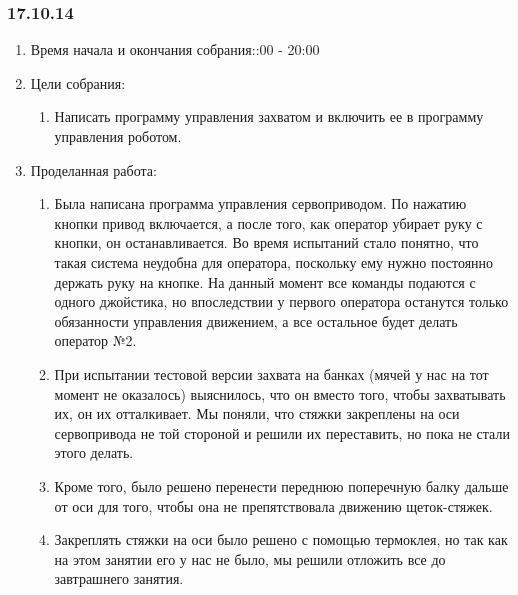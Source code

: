 
\subsubsection{17.10.14}

\begin{enumerate}
	\item Время начала и окончания собрания::00 - 20:00
	\item Цели собрания:\newline
	\begin{enumerate}
	  \item Написать программу управления захватом и включить ее в программу управления роботом.\newline
	  
    \end{enumerate}
    
	\item Проделанная работа:\newline
	\begin{enumerate}
	  \item Была написана программа управления сервоприводом. По нажатию кнопки привод включается, а после того, как оператор убирает руку с кнопки, он останавливается. Во время испытаний стало понятно, что такая система неудобна для оператора, поскольку ему нужно постоянно держать руку на кнопке. На данный момент все команды подаются с одного джойстика, но впоследствии у первого оператора останутся только обязанности управления движением, а все остальное будет делать оператор №2.\newline
      
      \item При испытании тестовой версии захвата на банках (мячей у нас на тот момент не оказалось) выяснилось, что он вместо того, чтобы захватывать их, он их отталкивает. Мы поняли, что стяжки закреплены на оси сервопривода не той стороной и решили их переставить, но пока не стали этого делать.\newline
      
      \item Кроме того, было решено перенести переднюю поперечную балку дальше от оси для того, чтобы она не препятствовала движению щеток-стяжек.\newline
      
      \item Закреплять стяжки на оси было решено с помощью термоклея, но так как на этом занятии его у нас не было, мы решили отложить все до завтрашнего занятия.\newline
      

\end{enumerate}
\end{enumerate}
